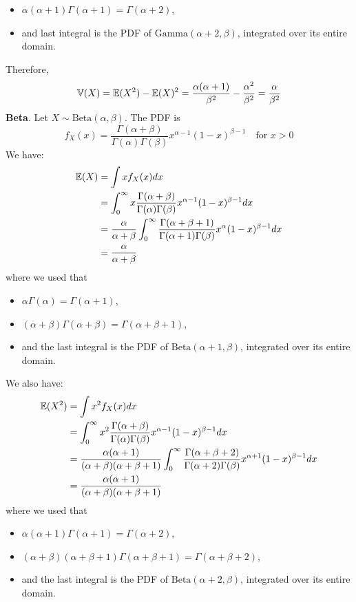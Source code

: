 \begin{itemize}[tightlist]
\item
  \(\alpha (\alpha + 1) \Gamma(\alpha + 1) = \Gamma(\alpha + 2)\),
\item
  and last integral is the PDF of \(\text{Gamma}(\alpha + 2, \beta)\),
  integrated over its entire domain.
\end{itemize}
Therefore,
\[
\operatorname{\mathbb{V}}(X) = \operatorname{\mathbb{E}}(X^{2}) - \operatorname{\mathbb{E}}(X)^{2} = \frac{\alpha (\alpha + 1)}{\beta^{2}} - \frac{\alpha^{2}}{\beta^{2}} = \frac{\alpha}{\beta^{2}}
\]
\textbf{Beta}. Let \(X \sim \text{Beta}(\alpha, \beta)\). The PDF is
\[
f_X(x) = \frac{\Gamma(\alpha + \beta)}{\Gamma(\alpha) \Gamma(\beta)} x^{\alpha - 1}(1 - x)^{\beta - 1} \quad \text{for } x > 0
\]
We have:
\begin{align*}
\operatorname{\mathbb{E}}(X) 
&= \int x f_X(x) dx \\
&= \int_{0}^{\infty} x \frac{\Gamma(\alpha + \beta)}{\Gamma(\alpha) \Gamma(\beta)} x^{\alpha - 1}(1 - x)^{\beta - 1} dx \\
&= \frac{\alpha}{\alpha + \beta} \int_{0}^{\infty} \frac{\Gamma(\alpha + \beta + 1)}{\Gamma(\alpha + 1) \Gamma(\beta)} x^{\alpha}(1 - x)^{\beta - 1} dx \\
&= \frac{\alpha}{\alpha + \beta}
\end{align*}
where we used that
\begin{itemize}[tightlist]
\item
  \(\alpha \Gamma(\alpha) = \Gamma(\alpha + 1)\),
\item
  \((\alpha + \beta) \Gamma(\alpha + \beta) = \Gamma(\alpha + \beta + 1)\),
\item
  and the last integral is the PDF of
  \(\text{Beta}(\alpha + 1, \beta)\), integrated over its entire domain.
\end{itemize}
We also have:
\begin{align*}
\operatorname{\mathbb{E}}(X^{2}) 
&= \int x^{2} f_X(x) dx \\
&= \int_{0}^{\infty} x^{2} \frac{\Gamma(\alpha + \beta)}{\Gamma(\alpha) \Gamma(\beta)} x^{\alpha - 1}(1 - x)^{\beta - 1} dx \\
&= \frac{\alpha (\alpha + 1)}{(\alpha + \beta)(\alpha + \beta + 1)} \int_{0}^{\infty} \frac{\Gamma(\alpha + \beta + 2)}{\Gamma(\alpha + 2) \Gamma(\beta)} x^{\alpha + 1}(1 - x)^{\beta - 1} dx \\
&= \frac{\alpha (\alpha + 1)}{(\alpha + \beta)(\alpha + \beta + 1)}
\end{align*}
where we used that
\begin{itemize}[tightlist]
\item
  \(\alpha (\alpha + 1) \Gamma(\alpha + 1) = \Gamma(\alpha + 2)\),
\item
  \((\alpha + \beta) (\alpha + \beta + 1) \Gamma(\alpha + \beta + 1) = \Gamma(\alpha + \beta + 2)\),
\item
  and the last integral is the PDF of
  \(\text{Beta}(\alpha + 2, \beta)\), integrated over its entire domain.
\end{itemize}
